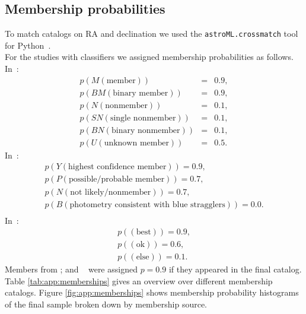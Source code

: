 \documentclass{aa}
\begin{document}

\begin{appendix}
\section{Membership probabilities}
\label{app:memberships}
To match catalogs on RA and declination we used the \texttt{astroML.crossmatch} tool for Python~\citep{astroML2012}.
\\
For the studies with classifiers we assigned membership probabilities as follows.
In~\citet{gonzalez_m67mem_2016}:
\begin{eqnarray*}
p(M (\text{member}))&=&0.9,\\
p(BM(\text{binary member}))&=&0.9,\\
p(N (\text{nonmember}))&=&0.1,\\
p(SN(\text{single nonmember}))&=&0.1,\\
p(BN (\text{binary nonmember}))&=&0.1,\\
p(U (\text{unknown member}))&=&0.5.
\end{eqnarray*}
In~\citet{curtis2013}:
\begin{eqnarray*}
p(Y (\text{highest confidence member}))=0.9,\\
p(P (\text{possible/probable member}))=0.7,\\
p(N (\text{not likely/nonmember}))=0.7,\\
p(B (\text{photometry consistent with blue stragglers}))=0.0.\\
\end{eqnarray*}
In~\citet{rebull_praesepe_2017}:
\begin{eqnarray*}
p((\text{best}))=0.9,\\
p((\text{ok}))=0.6,\\
p((\text{else}))=0.1.
\end{eqnarray*}
Members from \citet{rebull_pleiadesrot_2016, douglas_poking_2017}; and ~\citet{gaia_dr2_2018_hrd} were assigned $p=0.9$ if they appeared in the final catalog.
\\
Table \ref{tab:app:memberships} gives an overview over different membership catalogs. Figure \ref{fig:app:memberships} shows membership probability histograms of the final sample broken down by membership source.



\end{appendix}
\end{document}
